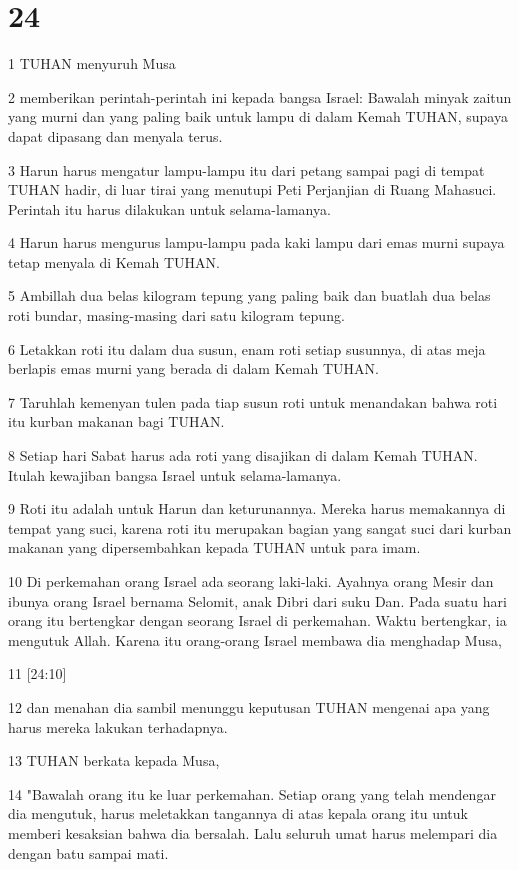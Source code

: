 \chapter{24}

\par 1 TUHAN menyuruh Musa
\par 2 memberikan perintah-perintah ini kepada bangsa Israel: Bawalah minyak zaitun yang murni dan yang paling baik untuk lampu di dalam Kemah TUHAN, supaya dapat dipasang dan menyala terus.
\par 3 Harun harus mengatur lampu-lampu itu dari petang sampai pagi di tempat TUHAN hadir, di luar tirai yang menutupi Peti Perjanjian di Ruang Mahasuci. Perintah itu harus dilakukan untuk selama-lamanya.
\par 4 Harun harus mengurus lampu-lampu pada kaki lampu dari emas murni supaya tetap menyala di Kemah TUHAN.
\par 5 Ambillah dua belas kilogram tepung yang paling baik dan buatlah dua belas roti bundar, masing-masing dari satu kilogram tepung.
\par 6 Letakkan roti itu dalam dua susun, enam roti setiap susunnya, di atas meja berlapis emas murni yang berada di dalam Kemah TUHAN.
\par 7 Taruhlah kemenyan tulen pada tiap susun roti untuk menandakan bahwa roti itu kurban makanan bagi TUHAN.
\par 8 Setiap hari Sabat harus ada roti yang disajikan di dalam Kemah TUHAN. Itulah kewajiban bangsa Israel untuk selama-lamanya.
\par 9 Roti itu adalah untuk Harun dan keturunannya. Mereka harus memakannya di tempat yang suci, karena roti itu merupakan bagian yang sangat suci dari kurban makanan yang dipersembahkan kepada TUHAN untuk para imam.
\par 10 Di perkemahan orang Israel ada seorang laki-laki. Ayahnya orang Mesir dan ibunya orang Israel bernama Selomit, anak Dibri dari suku Dan. Pada suatu hari orang itu bertengkar dengan seorang Israel di perkemahan. Waktu bertengkar, ia mengutuk Allah. Karena itu orang-orang Israel membawa dia menghadap Musa,
\par 11 [24:10]
\par 12 dan menahan dia sambil menunggu keputusan TUHAN mengenai apa yang harus mereka lakukan terhadapnya.
\par 13 TUHAN berkata kepada Musa,
\par 14 "Bawalah orang itu ke luar perkemahan. Setiap orang yang telah mendengar dia mengutuk, harus meletakkan tangannya di atas kepala orang itu untuk memberi kesaksian bahwa dia bersalah. Lalu seluruh umat harus melempari dia dengan batu sampai mati.
